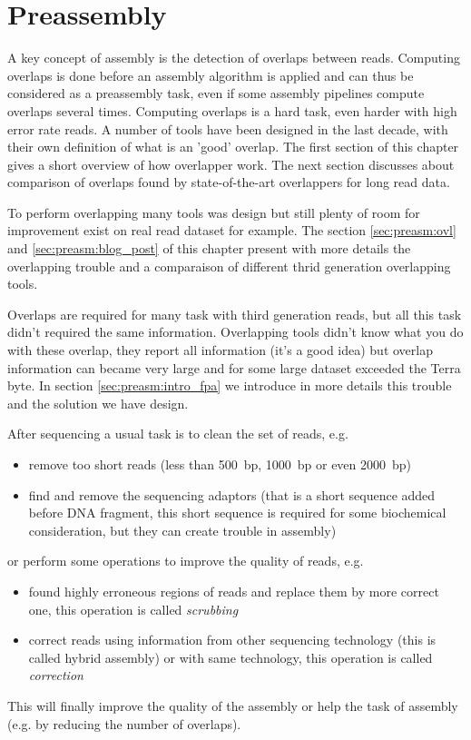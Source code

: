 \documentclass[main.tex]{subfiles}
\begin{document}
\chapter{Preassembly}\label{chapter:preassembly}

A key concept of assembly is the detection of overlaps between reads. Computing overlaps is done before an assembly algorithm is applied and can thus be considered as a preassembly task, even if some assembly pipelines compute overlaps several times. Computing overlaps is a hard task, even harder with high error rate reads. A number of tools have been designed in the last decade, with their own definition of what is an 'good' overlap. The first section of this chapter gives a short overview of how overlapper work. The next section discusses about comparison of overlaps found by state-of-the-art overlappers for long read data. 

To perform overlapping many tools was design but still plenty of room for improvement exist on real read dataset for example. The section \ref{sec:preasm:ovl} and \ref{sec:preasm:blog_post} of this chapter present with more details the overlapping trouble and a comparaison of different thrid generation overlapping tools.

Overlaps are required for many task with third generation reads, but all this task didn't required the same information. Overlapping tools didn't know what you do with these overlap, they report all information (it's a good idea) but overlap information can became very large and for some large dataset exceeded the Terra byte. In section \ref{sec:preasm:intro_fpa} we introduce in more details this trouble and the solution we have design.

\bigskip

After sequencing a usual task is to clean the set of reads, e.g.
\begin{itemize}
	\item remove too short reads (less than 500~bp, 1000~bp or even 2000~bp)
	\item find and remove the sequencing adaptors (that is a short sequence added before DNA fragment, this short sequence is required for some biochemical consideration, but they can create trouble in assembly)
\end{itemize}
or perform some operations to improve the quality of reads, e.g.
\begin{itemize}
	\item found highly erroneous regions of reads and replace them by more correct one, this operation is called \emph{scrubbing}
	\item correct reads using information from other sequencing technology (this is called hybrid assembly) or with same technology, this operation is called \emph{correction} 
\end{itemize}
This will finally improve the quality of the assembly or help the task of assembly (e.g. by reducing the number of overlaps). 
\end{document}
